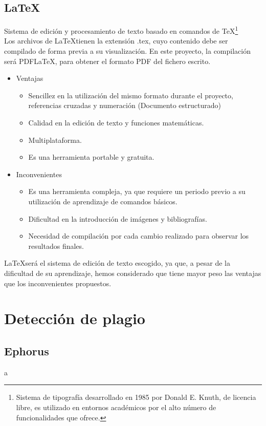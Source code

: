 \subsection{\LaTeX}
Sistema de edición y procesamiento de texto basado en comandos de TeX\footnote{Sistema de tipografía desarrollado en 1985 por Donald E. Knuth, de licencia libre, es utilizado en entornos académicos por el alto número de funcionalidades que ofrece\cite{wiki:Tex}.}\\
Los archivos de \LaTeX tienen la extensión .tex, cuyo contenido debe ser compilado de forma previa a su visualización. En este proyecto, la compilación será PDFLaTeX, para obtener el formato PDF del fichero escrito. 
\begin{itemize}
\item Ventajas
\begin{itemize}
\item Sencillez en la utilización del mismo formato durante el proyecto, referencias cruzadas y numeración (Documento estructurado)
\item Calidad en la edición de texto y funciones matemáticas. 
\item Multiplataforma.
\item Es una herramienta portable y gratuita.
\end{itemize}
\end{itemize}
\begin{itemize}
\item Inconvenientes
\begin{itemize}
\item Es una herramienta compleja, ya que requiere un periodo previo a su utilización de aprendizaje de comandos básicos. 
\item Dificultad en la introducción de imágenes  y bibliografías.
\item Necesidad de compilación por cada cambio realizado para observar los resultados finales. \nocite{aq:LaTex} 
\end{itemize}
\end{itemize}
\LaTeX  será el sistema de edición de texto escogido, ya que, a pesar de la dificultad de su aprendizaje, hemos considerado que tiene mayor peso las ventajas que los inconvenientes propuestos.

\section{Detección de plagio}
\subsection{Ephorus}
a
